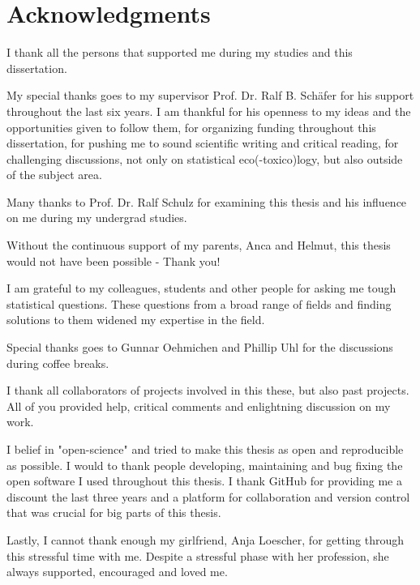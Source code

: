 
\begingroup
\let\clearpage\relax
\let\cleardoublepage\relax
\let\cleardoublepage\relax

\chapter*{Acknowledgments}

I thank all the persons that supported me during my studies and this dissertation.

\noindent My special thanks goes to my supervisor Prof. Dr. Ralf B. Schäfer for his support throughout the last six years. 
I am thankful for his openness to my ideas and the opportunities given to follow them, 
for organizing funding throughout this dissertation, 
for pushing me to sound scientific writing and critical reading, 
for challenging discussions, not only on statistical eco(-toxico)logy, but also outside of the subject area.

\noindent Many thanks to Prof. Dr. Ralf Schulz for examining this thesis and his influence on me during my undergrad studies.

\noindent Without the continuous support of my parents, Anca and Helmut, this thesis would not have been possible - Thank you!

\noindent I am grateful to my colleagues, students and other people for asking me tough statistical questions. 
These questions from a broad range of fields and finding solutions to them widened my expertise in the field.

\noindent Special thanks goes to Gunnar Oehmichen and Phillip Uhl for the discussions during coffee breaks.

\noindent I thank all collaborators of projects involved in this these, but also past projects. All of you provided help, critical comments and enlightning discussion on my work.

\noindent I belief in "open-science" and tried to make this thesis as open and reproducible as possible. I would to thank people developing, maintaining and bug fixing the open software I used throughout this thesis. I thank GitHub for providing me a discount the last three years and a platform for collaboration and version control that was crucial for big parts of this thesis. 

\noindent Lastly, I cannot thank enough my girlfriend, Anja Loescher, for getting through this stressful time with me.
Despite a stressful phase with her profession, she always supported, encouraged and loved me. 


\endgroup 
